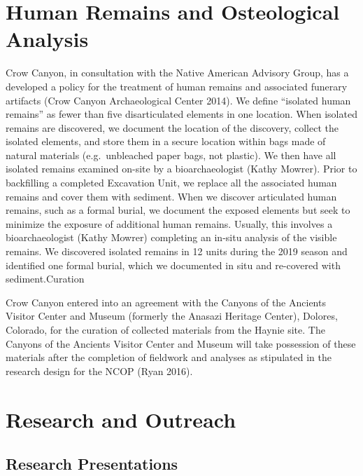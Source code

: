 \documentclass[
  12pt,
]{krantz}
\begin{document}
\hypertarget{human-remains-and-osteological-analysis}{%
\chapter{Human Remains and Osteological Analysis}\label{human-remains-and-osteological-analysis}}

Crow Canyon, in consultation with the Native American Advisory Group,
has a developed a policy for the treatment of human remains and
associated funerary artifacts (Crow Canyon Archaeological Center 2014).
We define ``isolated human remains'' as fewer than five disarticulated
elements in one location. When isolated remains are discovered, we
document the location of the discovery, collect the isolated elements,
and store them in a secure location within bags made of natural
materials (e.g.~unbleached paper bags, not plastic). We then have all
isolated remains examined on-site by a bioarchaeologist (Kathy Mowrer).
Prior to backfilling a completed Excavation Unit, we replace all the
associated human remains and cover them with sediment. When we discover
articulated human remains, such as a formal burial, we document the
exposed elements but seek to minimize the exposure of additional human
remains. Usually, this involves a bioarchaeologist (Kathy Mowrer)
completing an in-situ analysis of the visible remains. We discovered
isolated remains in 12 units during the 2019 season and identified one
formal burial, which we documented in situ and re-covered with
sediment.Curation

Crow Canyon entered into an agreement with the Canyons of the Ancients
Visitor Center and Museum (formerly the Anasazi Heritage Center),
Dolores, Colorado, for the curation of collected materials from the
Haynie site. The Canyons of the Ancients Visitor Center and Museum will
take possession of these materials after the completion of fieldwork and
analyses as stipulated in the research design for the NCOP (Ryan
2016).

\hypertarget{research-and-outreach}{%
\chapter{Research and Outreach}\label{research-and-outreach}}

\hypertarget{research-presentations}{%
\section{Research Presentations}\label{research-presentations}}
\end{document}
